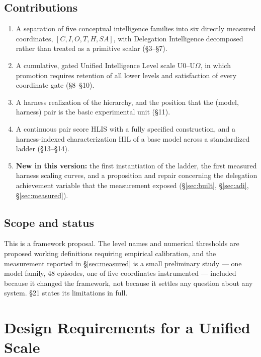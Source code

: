 \documentclass[11pt]{article}
\theoremstyle{definition}
\newcommand{\Om}{\ensuremath{\Omega}}
\begin{document}
\subsection{Contributions}

\begingroup\sloppy
\begin{enumerate}
\item A separation of five conceptual intelligence families into six directly measured coordinates,
      $[C,I,O,T,H,SA]$, with Delegation Intelligence decomposed rather than treated as a primitive scalar (\S3--\S7).
\item A cumulative, gated Unified Intelligence Level scale U0--U\Om{}, in which promotion requires retention of all lower levels and satisfaction of every coordinate gate (\S8--\S10).
\item A harness realization of the hierarchy, and the position that the (model, harness) pair is the basic experimental unit (\S11).
\item A continuous pair score HLIS with a fully specified construction, and a harness-indexed characterization HIL of a base model across a standardized ladder (\S13--\S14).
\item \textbf{New in this version:} the first instantiation of the ladder, the first measured harness scaling curves, and a proposition and repair concerning the delegation achievement variable that the measurement exposed (\S\ref{sec:built}, \S\ref{sec:adi}, \S\ref{sec:measured}).
\end{enumerate}
\endgroup

\subsection{Scope and status}

This is a framework proposal. The level names and numerical thresholds are proposed working definitions requiring empirical calibration, and the measurement reported in \S\ref{sec:measured} is a small preliminary study --- one model family, 48 episodes, one of five coordinates instrumented --- included because it changed the framework, not because it settles any question about any system. \S21 states its limitations in full.

\section{Design Requirements for a Unified Scale}
\end{document}

